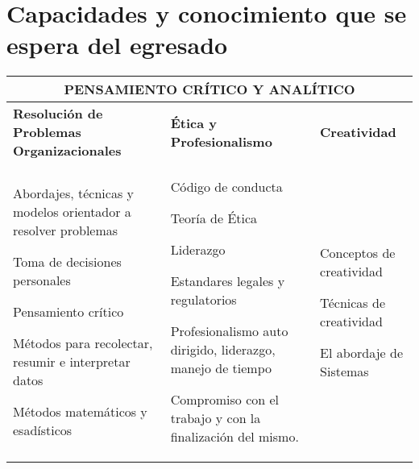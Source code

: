 \section{Capacidades y conocimiento que se espera del egresado}\label{sec:IS-Capabilities-and-Knowledgement}

\newenvironment{capenv}{\begin{description}}{\end{description}}

\begin{center}
\begin{tabularx}{\textwidth}{|X|X|X|} \hline
\multicolumn{3}{|c|}{\textbf{PENSAMIENTO CRÍTICO Y ANALÍTICO}} \\ \hline
\textbf{Resolución de Problemas Organizacionales} & \textbf{Ética y Profesionalismo} & \textbf{Creatividad} \\ \hline
\begin{capenv}
\item Abordajes, técnicas y modelos orientador a resolver problemas
\item Toma de decisiones personales
\item Pensamiento crí­tico
\item Métodos para recolectar, resumir e interpretar datos
\item Métodos matemáticos y esadí­sticos
\end{capenv}
&
\begin{capenv}
\item Código de conducta
\item Teorí­a de Ética
\item Liderazgo
\item Estandares legales y regulatorios
\item Profesionalismo auto dirigido, liderazgo, manejo de tiempo
\item Compromiso con el trabajo y con la finalización del mismo.
\end{capenv}
&
\begin{capenv}
\item Conceptos de creatividad
\item Técnicas de creatividad
\item El abordaje de Sistemas
\end{capenv} \\ \hline

\end{tabularx}
\end{center}

